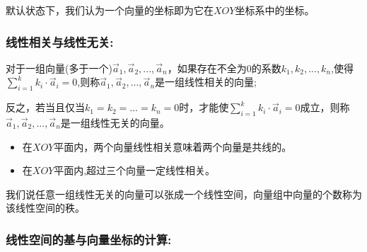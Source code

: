 \documentclass[UTF8]{article}
\begin{document}
默认状态下，我们认为一个向量的坐标即为它在$XOY$坐标系中的坐标。

\subsubsection{线性相关与线性无关:}
对于一组向量(多于一个)$\vec{a}_1, \vec{a}_2, ..., \vec{a}_n$，如果存在不全为$0$的系数$k_1, k_2, ..., k_n$,使得$\sum_{i = 1}^{k}{k_i\cdot \vec{a}_i} = 0$,则称$\vec{a}_1, \vec{a}_2, ..., \vec{a}_n$是一组线性相关的向量;

反之，若当且仅当$k_1 = k_2 = ... = k_n = 0$时，才能使$\sum_{i = 1}^{k}{k_i\cdot \vec{a}_i} = 0$成立，则称$\vec{a}_1, \vec{a}_2, ..., \vec{a}_n$是一组线性无关的向量。

\begin{itemize}
	\item 在$XOY$平面内，两个向量线性相关意味着两个向量是共线的。
	\item 在$XOY$平面内,超过三个向量一定线性相关。
\end{itemize}

我们说任意一组线性无关的向量可以张成一个线性空间，向量组中向量的个数称为该线性空间的秩。

\subsubsection{线性空间的基与向量坐标的计算:}
\end{document}
